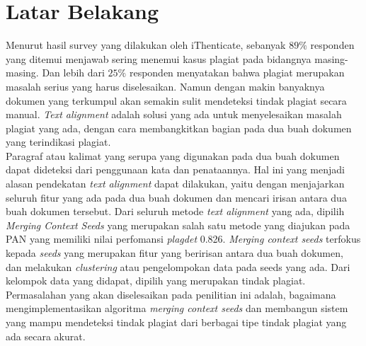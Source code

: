 \documentclass[../Book, Implementasi Algoritma Merging Context Seeds untuk Plagiarism Detection.tex]{subfiles}
\begin{document}
	\section{Latar Belakang}
	Menurut hasil survey yang dilakukan oleh iThenticate\cite{it}, sebanyak $89\%$ responden yang ditemui menjawab sering menemui kasus plagiat pada bidangnya masing-masing. Dan lebih dari $25\%$ responden menyatakan bahwa plagiat merupakan masalah serius yang harus diselesaikan. Namun dengan makin banyaknya dokumen yang terkumpul akan semakin sulit mendeteksi tindak plagiat secara manual. \textit{Text alignment} adalah solusi yang ada untuk menyelesaikan masalah plagiat yang ada, dengan cara membangkitkan bagian pada dua buah dokumen yang terindikasi plagiat. \\
	
	\noindent Paragraf atau kalimat yang serupa yang digunakan pada dua buah dokumen dapat dideteksi dari penggunaan kata dan penataannya. Hal ini yang menjadi alasan pendekatan \textit{text alignment} dapat dilakukan, yaitu dengan menjajarkan seluruh fitur yang ada pada dua buah dokumen dan mencari irisan antara dua buah dokumen tersebut. Dari seluruh metode \textit{text alignment} yang ada, dipilih \textit{Merging Context Seeds} yang merupakan salah satu metode yang diajukan pada PAN\cite{pan-task-2014} yang memiliki nilai perfomansi \textit{plagdet} 0.826. \textit{Merging context seeds} terfokus kepada \textit{seeds} yang merupakan fitur yang beririsan antara dua buah dokumen, dan melakukan \textit{clustering} atau pengelompokan data pada seeds yang ada. Dari kelompok data yang didapat, dipilih yang merupakan tindak plagiat. \\
	
	\noindent Permasalahan yang akan diselesaikan pada penilitian ini adalah, bagaimana mengimplementasikan algoritma \textit{merging context seeds} dan membangun sistem yang mampu mendeteksi tindak plagiat dari berbagai tipe tindak plagiat yang ada secara akurat.
\end{document}
